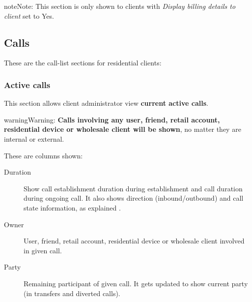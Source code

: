 \documentclass[letterpaper,10pt,english]{sphinxmanual}
\begin{document}
\begin{notice}{note}{Note:}
This section is only shown to clients with \emph{Display billing details to client} set to Yes.
\end{notice}


\subsection{Calls}
\label{administration_portal/client/residential/calls/index::doc}\label{administration_portal/client/residential/calls/index:calls}
These are the call-list sections for residential clients:


\subsubsection{Active calls}
\label{administration_portal/client/residential/calls/active_calls::doc}\label{administration_portal/client/residential/calls/active_calls:active-calls}
This section allows client administrator view \textbf{current active calls}.

\begin{notice}{warning}{Warning:}
\textbf{Calls involving any user, friend, retail account, residential device or wholesale client will be shown},
no matter they are internal or external.
\end{notice}

These are columns shown:
\begin{description}
\item[{Duration}] \leavevmode{}\label{administration_portal/client/residential/calls/active_calls:term-duration}
Show call establishment duration during establishment and call duration during ongoing call. It also shows
direction (inbound/outbound) and call state information, as explained {\hyperref[administration_portal/platform/active_calls:call\string-state]{}}.

\item[{Owner}] \leavevmode{}\label{administration_portal/client/residential/calls/active_calls:term-owner}
User, friend, retail account, residential device or wholesale client involved in given call.

\item[{Party}] \leavevmode{}\label{administration_portal/client/residential/calls/active_calls:term-party}
Remaining participant of given call. It gets updated to show current party (in transfers and diverted calls).

\end{description}
\end{document}
